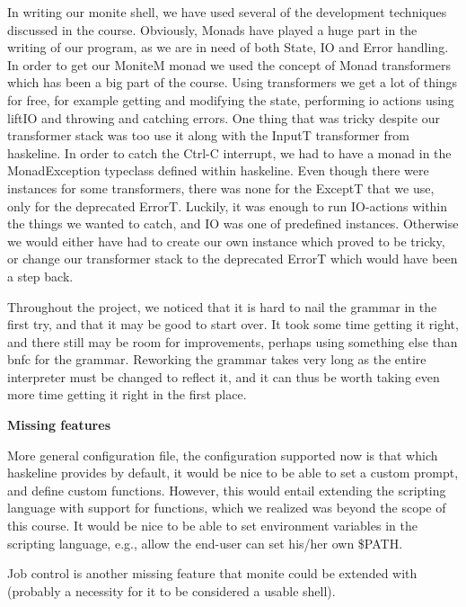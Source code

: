 \documentclass[11pt,a4paper]{article}
\begin{document}
In writing our monite shell, we have used several of the development techniques
discussed in the course. Obviously, Monads have played a huge part in the
writing of our program, as we are in need of both State, IO and Error handling.
In order to get our MoniteM monad we used the concept of Monad transformers
which has been a big part of the course. Using transformers we get a lot of
things for free, for example getting and modifying the state, performing io
actions using liftIO and throwing and catching errors. One thing that was
tricky despite our transformer stack was too use it along with the InputT
transformer from haskeline. In order to catch the Ctrl-C interrupt, we had to
have a monad in the MonadException typeclass defined within haskeline. Even
though there were instances for some transformers, there was none for the
ExceptT that we use, only for the deprecated ErrorT. Luckily, it was enough to
run IO-actions within the things we wanted to catch, and IO was one of
predefined instances. Otherwise we would either have had to create our own
instance which proved to be tricky, or change our transformer stack to the
deprecated ErrorT which would have been a step back.

Throughout the project, we noticed that it is hard to nail the grammar in the
first try, and that it may be good to start over. It took some time getting it
right, and there still may be room for improvements, perhaps using something
else than bnfc for the grammar. Reworking the grammar takes very long as the
entire interpreter must be changed to reflect it, and it can thus be worth
taking even more time getting it right in the first place.

\textbf{Missing features}

More general configuration file, the configuration supported now is that which
haskeline provides by default, it would be nice to be able to set a custom
prompt, and define custom functions. However, this would entail extending the
scripting language with support for functions, which we realized was beyond the
scope of this course. It would be nice to be able to set environment variables
in the scripting language, e.g., allow the end-user can set his/her own \$PATH.

Job control is another missing feature that monite could be extended with
(probably a necessity for it to be considered a usable shell).
\end{document}
